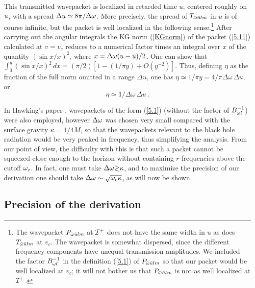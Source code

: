 This transmitted wavepacket is localized in retarded time
$u$, centered roughly on $\bar{u}$, with a spread
$\Delta u\simeq 8\pi/\Delta\omega$. More precisely,
the spread of $T_{\bar{\omega}\bar{u} lm}$ in $u$ is
of course infinite, but the packet is well localized in the
following sense.\footnote{The wavepacket
$P_{\bar{\omega}\bar{u} lm}$ at ${\cal I}^+$
does not have the same width in $u$ as does
$T_{\bar{\omega}\bar{u} lm}$ at $v_c$. The wavepacket is somewhat
dispersed, since the different frequency
components have unequal transmission amplitudes.
We included the factor $B_{\omega l}^{-1}$ in the
definition (\ref{5.1}) of $P_{\bar{\omega}\bar{u} lm}$ so that
our packet would be well localized at $v_c$; it will not
bother us that $P_{\bar{\omega}\bar{u} lm}$ is not as well localized
at ${\cal I}^+$.}
After carrying out the
angular integrals the KG norm (\ref{KGnorm}) of the packet
(\ref{5.11})
calculated at $v=v_c$ reduces to a numerical factor times an
integral over $x$ of the quantity $(\sin x/x)^2$, where
$x=\Delta\omega(u-\bar{u})/2$.
One can show that
$\int_0^y(\sin x/x)^2\, dx=(\pi/2)[1-(1/\pi y)+O(y^{-2})]$.
Thus, defining $\eta$ as the fraction of the full norm omitted in a
range $\Delta u$, one
has $\eta\simeq 1/\pi y = 4/\pi \Delta\omega\, \Delta u$, or
\begin{equation}
\eta\simeq 1/\Delta\omega\, \Delta u\, .
\label{eq:eta}
\end{equation}

In Hawking's paper \cite{Hawk75}, wavepackets of the
form (\ref{5.1}) (without the factor of $B_{\omega l}^{-1}$)
were also employed, however
$\Delta\omega$ was chosen very small compared with
the surface gravity $\kappa=1/4M$, so that the wavepackets
relevant to the black hole radiation would be very peaked
in frequency, thus simplifying the analysis. From our point
of view, the difficulty with this is that
such a packet cannot be squeezed close enough to the horizon
without containing $r$-frequencies above the cutoff $\omega_c$.
In fact, one must take $\Delta\o\gtwid \kappa$, and to maximize
the precision of our derivation one should take
$\Delta\omega\sim \sqrt{\omega_c\kappa}$, as will now be shown.

\subsection{Precision of the derivation}
\label{subsec:precision}

